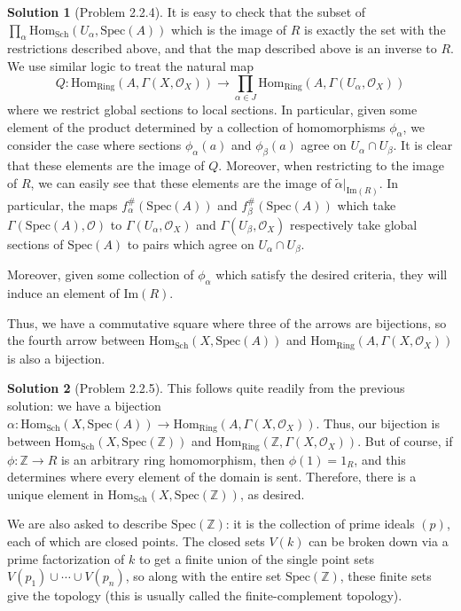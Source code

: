 \documentclass[aps,pra,showpacs,notitlepage,onecolumn,superscriptaddress,nofootinbib]{revtex4-1}
\theoremstyle{definition}
\newtheorem{solution}{Solution}[section]
\begin{document}
\begin{solution}[Problem 2.2.4]
  It is easy to check that the subset of $\prod_{\alpha} \text{Hom}_{\text{Sch}}(U_{\alpha}, \text{Spec}(A))$ which is the image of $R$ is exactly the set with the restrictions described above, and that the map
  described above is an inverse to $R$. We use similar logic to treat the natural map
  \begin{equation}
    Q : \text{Hom}_{\text{Ring}}(A, \Gamma(X, \mathcal{O}_X)) \rightarrow \displaystyle\prod_{\alpha \in J} \text{Hom}_{\text{Ring}}(A, \Gamma(U_{\alpha}, \mathcal{O}_X))
    \end{equation}
  where we restrict global sections to local sections. In particular, given some element of the product determined by a collection of homomorphisms $\phi_{\alpha}$, we consider the case
  where sections $\phi_{\alpha}(a)$ and $\phi_{\beta}(a)$ agree on $U_{\alpha} \cap U_{\beta}$. It is clear that these elements are the image of $Q$. Moreover, when restricting to the image of
  $R$, we can easily see that these elements are the image of $\widetilde{\alpha}|_{\text{Im}(R)}$. In particular, the maps $f_{\alpha}^{\#}(\text{Spec}(A))$ and $f_{\beta}^{\#}(\text{Spec}(A))$
  which take $\Gamma(\text{Spec}(A), \mathcal{O})$ to $\Gamma(U_{\alpha}, \mathcal{O}_X)$ and $\Gamma(U_{\beta}, \mathcal{O}_X)$ respectively take global sections of $\text{Spec}(A)$ to pairs
  which agree on $U_{\alpha} \cap U_{\beta}$.

  Moreover, given some collection of $\phi_{\alpha}$ which satisfy the desired criteria, they will induce an element of $\text{Im}(R)$.

  Thus, we have a commutative square where three of the arrows are bijections, so the fourth arrow between $\text{Hom}_{\text{Sch}}(X, \text{Spec}(A))$ and $\text{Hom}_{\text{Ring}}(A, \Gamma(X, \mathcal{O}_X))$ is also a
  bijection.
  \end{solution}

\begin{solution}[Problem 2.2.5]
  This follows quite readily from the previous solution: we have a bijection $\alpha : \text{Hom}_{\text{Sch}}(X, \text{Spec}(A)) \rightarrow \text{Hom}_{\text{Ring}}(A, \Gamma(X, \mathcal{O}_X))$. Thus,
  our bijection is between $\text{Hom}_{\text{Sch}}(X, \text{Spec}(\mathbb{Z}))$ and $\text{Hom}_{\text{Ring}}(\mathbb{Z}, \Gamma(X, \mathcal{O}_X))$. But of course, if $\phi : \mathbb{Z} \rightarrow R$ is an
  arbitrary ring homomorphism, then $\phi(1) = 1_R$, and this determines where every element of the domain is sent. Therefore, there is a unique element in $\text{Hom}_{\text{Sch}}(X, \text{Spec}(\mathbb{Z}))$, as desired.

  We are also asked to describe $\text{Spec}(\mathbb{Z})$: it is the collection of prime ideals $(p)$, each of which are closed points. The closed sets $V(k)$ can be broken down via a prime factorization of $k$
  to get a finite union of the single point sets $V(p_1) \cup \cdots \cup V(p_n)$, so along with the entire set $\text{Spec}(\mathbb{Z})$, these finite sets give the topology (this is usually called the finite-complement topology).

  \end{solution}
\end{document}
